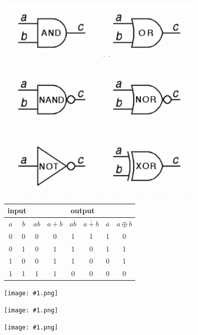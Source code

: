 \documentclass[10pt,a4paper]{article}
\providecommand{\code}[2]{}
\def\img#1#2{\begin{tcolorbox}[title=#2]\texttt{[image: \#1.png]}\end{tcolorbox}}
\begin{document}
\begin{CJK}{UTF8}{song}
\begin{twocolumn}
\begin{tcolorbox}[title=逻辑门电路]
			\centering
			\includegraphics[width=0.75\textwidth]{CMOS.png}
			\begin{tabular}{|c|c|c|c|c|c|c|c|}
				\hline
				\multicolumn{2}{|c|}{input} & \multicolumn{6}{c|}{output} \\
				\hline
				$ a $ & $ b $  & $ ab $ & $ a+b $ & $ \overline{ab} $ & $ \overline{a+b} $& $\overline{a}$ & $a\oplus b$ \\
				\hline
				0 & 0 & 0 & 0 & 1 & 1 & 1 & 0 \\
				\hline
				0 & 1 & 0 & 1 & 1 & 0 & 1 & 1 \\
				\hline
				1 & 0 & 0 & 1 & 1 & 0 & 0 & 1 \\
				\hline
				1 & 1 & 1 & 1 & 0 & 0 & 0 & 0 \\
				\hline
			\end{tabular}
		\end{tcolorbox}
		\begin{tcolorbox}[title=锁存器和数据传输器]
			\img{latch}{74LS373 D Latch}
			\img{dt}{Data Bus Transceiver}
		\end{tcolorbox}
		\img{buscycle}{8086/88 总线周期}
	\end{twocolumn}
	\end{CJK}
\end{document}
